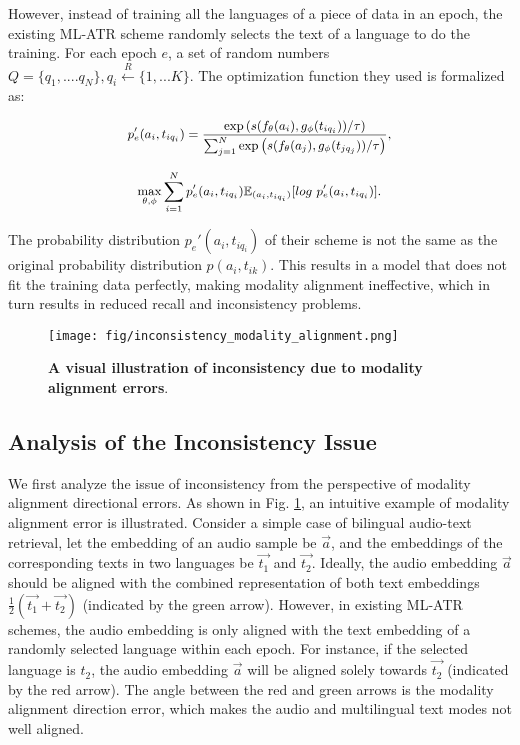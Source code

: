 However, instead of training all the languages of a piece of data in an epoch, the existing ML-ATR scheme randomly selects the text of a language to do the training. For each epoch $e$, a set of random numbers $Q=\{q_1,... .q_N\},q_i\stackrel{R}{\leftarrow}\{1,...K\}$. The optimization function they used is formalized as:

\begin{equation}
\label{Eq:error distribution}
\small
    \begin{aligned}
        p_e'(a_i,t_{iq_i})= \frac{\exp\left(s(f_\theta(a_i), g_\phi(t_{iq_i})) / \tau \right)}
  {\sum_{j=1}^N \exp\left(s(f_\theta(a_j), g_\phi(t_{jq_j})) / \tau \right)},
    \end{aligned}
\end{equation}

\begin{equation}
\small
\begin{aligned}
\max_{\theta, \phi}\sum^{N}_{i=1}p_e'(a_i,t_{iq_i}) \mathbb{E}_{(a_i,t_{iq_i})}[log\ p_e'(a_i,t_{iq_i})].
\end{aligned}
\end{equation}

The probability distribution $p_e'(a_i,t_{iq_i})$ of their scheme is not the same as the original probability distribution $p(a_i,t_{ik})$. This results in a model that does not fit the training data perfectly, making modality alignment ineffective, which in turn results in reduced recall and inconsistency problems.

\begin{figure}[htbp]
    \centering
    \texttt{[image: fig/inconsistency\_modality\_alignment.png]}
    \caption{\textbf{A visual illustration of inconsistency due to modality alignment errors}.}
    \label{Fig:modality alignment error}
\end{figure}

\subsection{Analysis of the Inconsistency Issue}
\label{Sect:Description of the Inconsistency Issue}
We first analyze the issue of inconsistency from the perspective of modality alignment directional errors. As shown in Fig. \ref{Fig:modality alignment error}, an intuitive example of modality alignment error is illustrated. Consider a simple case of bilingual audio-text retrieval, let the embedding of an audio sample be $\vec{a}$, and the embeddings of the corresponding texts in two languages be $\vec{t_1}$ and $\vec{t_2}$. Ideally, the audio embedding $\vec{a}$ should be aligned with the combined representation of both text embeddings $\frac{1}{2}(\vec{t_1} + \vec{t_2})$ (indicated by the green arrow). However, in existing ML-ATR schemes, the audio embedding is only aligned with the text embedding of a randomly selected language within each epoch. For instance, if the selected language is $t_2$, the audio embedding $\vec{a}$ will be aligned solely towards $\vec{t_2}$ (indicated by the red arrow). The angle between the red and green arrows is the modality alignment direction error, which makes the audio and multilingual text modes not well aligned.

